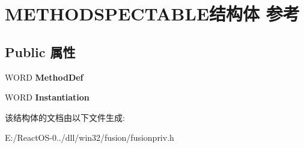\hypertarget{struct_m_e_t_h_o_d_s_p_e_c_t_a_b_l_e}{}\section{M\+E\+T\+H\+O\+D\+S\+P\+E\+C\+T\+A\+B\+L\+E结构体 参考}
\label{struct_m_e_t_h_o_d_s_p_e_c_t_a_b_l_e}
\subsection*{Public 属性}
\begin{DoxyCompactItemize}
\item 
\mbox{\label{struct_m_e_t_h_o_d_s_p_e_c_t_a_b_l_e_a62aec7dc6d1f3e8ee480b5ad5024075d}} 
W\+O\+RD {\bfseries Method\+Def}
\item 
\mbox{\label{struct_m_e_t_h_o_d_s_p_e_c_t_a_b_l_e_a8df6ed3568ac46dd6b805685b69a02a8}} 
W\+O\+RD {\bfseries Instantiation}
\end{DoxyCompactItemize}


该结构体的文档由以下文件生成\+:\begin{DoxyCompactItemize}
\item 
E\+:/\+React\+O\+S-\/0../dll/win32/fusion/fusionpriv.\+h\end{DoxyCompactItemize}
